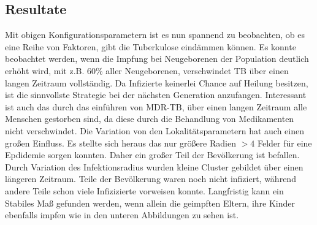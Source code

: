 \documentclass[paper=a4, fontsize=11pt, ngerman, abstract=on]{scrartcl}
\numberwithin{equation}{section} %
\numberwithin{figure}{section} %
\numberwithin{table}{section} %
\begin{document}
\subsection{Resultate}

Mit obigen Konfigurationsparametern ist es nun spannend zu beobachten, ob es eine Reihe von Faktoren, gibt die Tuberkulose eindämmen können. Es konnte beobachtet werden, wenn die Impfung bei Neugeborenen der Population deutlich erhöht wird, mit z.B. 60\% aller Neugeborenen, verschwindet TB über einen langen Zeitraum vollständig. Da Infizierte keinerlei Chance auf Heilung besitzen, ist die sinnvollste Strategie bei der nächsten Generation anzufangen. Interessant ist auch das durch das einführen von MDR-TB, über einen langen Zeitraum alle Menschen gestorben sind, da diese durch die Behandlung von Medikamenten nicht verschwindet. Die Variation von den Lokalitätsparametern hat auch einen großen Einfluss. Es stellte sich heraus das nur größere Radien $> 4$ Felder für eine Epdidemie sorgen konnten. Daher ein großer Teil der Bevölkerung ist befallen. Durch Variation des Infektionsradius wurden kleine Cluster gebildet über einen längeren Zeitraum. Teile der Bevölkerung waren noch nicht infiziert, während andere Teile schon viele Infizizierte vorweisen konnte. Langfristig kann ein Stabiles Maß gefunden werden, wenn allein die geimpften Eltern, ihre Kinder ebenfalls impfen wie in den unteren Abbildungen zu sehen ist.
\end{document}
